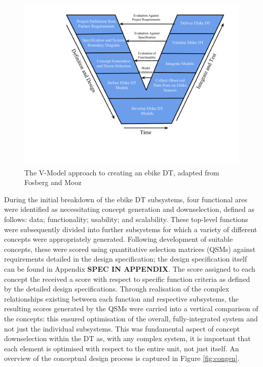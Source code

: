 \documentclass[a4paper, 10pt]{article}
\numberwithin{equation}{section}
\begin{document}
\begin{figure}[H]
    \centering
    \includegraphics[width=0.7\linewidth]{images/Concept_Gen/vee_model.pdf}
    \caption{The V-Model approach to creating an ebike DT, adapted from Fosberg and Mooz \cite{report:v_model}}
    \label{fig:v_model}
\end{figure}

During the initial breakdown of the ebike DT subsystems, four functional ares were identified as necessitating concept generation and downselection, defined as follows: data; functionality; usability; and scalability. These top-level functions were subsequently divided into further subsystems for which a variety of different concepts were appropriately generated. Following development of suitable concepts, these were scored using quantitative selection matrices (QSMs) against requirements detailed in the design specification; the design specification itself can be found in Appendix \textbf{SPEC IN APPENDIX}. The score assigned to each concept  the received a score with respect to specific function criteria as defined by the detailed design specifications. Through realisation of the complex relationships existing between each function and respective subsystems, the resulting scores generated by the QSMs were carried into a vertical comparison of the concepts: this ensured optimisation of the overall, fully-integrated system and not just the individual subsystems. This was fundamental aspect of concept downselection within the DT as, with any complex system, it is important that each element is optimised with respect to the entire unit, not just itself. An overview of the conceptual design process is captured in Figure \ref{fig:congen}.
\end{document}
